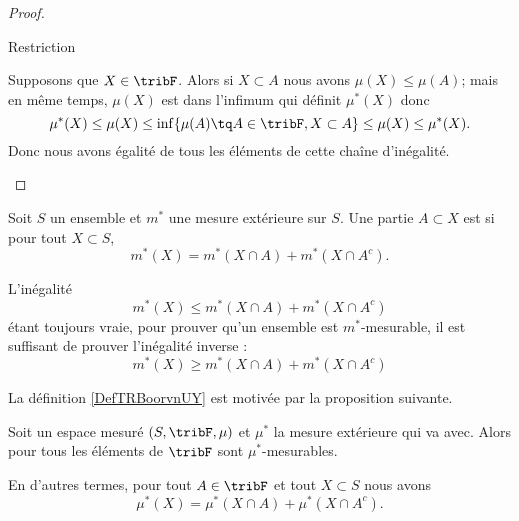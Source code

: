 \begin{proof}
\begin{subproof}
    \item[Restriction]

    Supposons que \( X\in\tribF\). Alors si \( X\subset A\) nous avons \( \mu(X)\leq \mu(A)\); mais en même temps, \( \mu(X)\) est dans l'infimum qui définit \( \mu^*(X)\) donc
    \begin{equation}
        \mu^*(X)\leq\mu(X)\leq \inf \{ \mu(A)\tq A\in\tribF,X\subset A \}\leq \mu(X)\leq\mu^*(X).
    \end{equation}
    Donc nous avons égalité de tous les éléments de cette chaîne d'inégalité.
    \end{subproof}
\end{proof}

\begin{definition}  \label{DefTRBoorvnUY}
    Soit \( S\) un ensemble et \( m^*\) une mesure extérieure sur \( S\). Une partie \( A\subset X\) est  si pour tout \( X\subset S\),
    \begin{equation}
        m^*(X)=m^*(X\cap A)+m^*(X\cap A^c).
    \end{equation}
\end{definition}


\begin{remark}
    L'inégalité
    \begin{equation}
        m^*(X)\leq m^*(X\cap A)+m^*(X\cap A^c)
    \end{equation}
    étant toujours vraie, pour prouver qu'un ensemble est \( m^*\)-mesurable, il est suffisant de prouver l'inégalité inverse : 
    \begin{equation}
        m^*(X)\geq m^*(X\cap A)+m^*(X\cap A^c)
    \end{equation}
\end{remark}
La définition \ref{DefTRBoorvnUY} est motivée par la proposition suivante.

\begin{proposition} \label{PropOJFoozSKAE}
    Soit un espace mesuré \( (S,\tribF,\mu)\) et \( \mu^*\) la mesure extérieure qui va avec. Alors pour tous les éléments de \( \tribF\) sont \( \mu^*\)-mesurables. 
    
    En d'autres termes, pour tout \( A\in\tribF\) et tout \( X\subset S\) nous avons
    \begin{equation}
        \mu^*(X)=\mu^*(X\cap A)+\mu^*(X\cap A^c).
    \end{equation}
\end{proposition}

